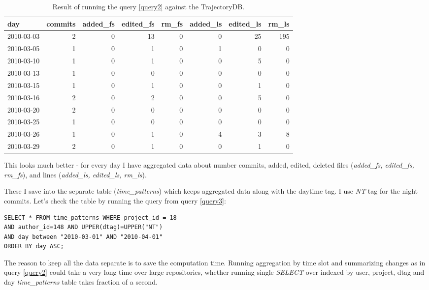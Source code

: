 \documentclass[a4paper,10pt]{article}
\numberwithin{equation}{subsection}
\begin{document}
\begin{table}[h]
  \label{tab:second}
  \caption{Result of running the query \ref{query2} against the TrajectoryDB.}
  \begin{tabularx}{400pt}{ | X | r | r | r | r | r | r | r | }
  \hline           
day & commits & added\_fs & edited\_fs & rm\_fs & added\_ls & edited\_ls & rm\_ls\\ 
\hline           
2010-03-03 & 2 & 0 & 13 & 0 & 0 & 25 & 195\\ 
2010-03-05 & 1 & 0 & 1 & 0 & 1 & 0 & 0\\ 
2010-03-10 & 1 & 0 & 1 & 0 & 0 & 5 & 0\\ 
2010-03-13 & 1 & 0 & 0 & 0 & 0 & 0 & 0\\ 
2010-03-15 & 1 & 0 & 1 & 0 & 0 & 1 & 0\\ 
2010-03-16 & 2 & 0 & 2 & 0 & 0 & 5 & 0\\ 
2010-03-20 & 2 & 0 & 0 & 0 & 0 & 0 & 0\\ 
2010-03-25 & 1 & 0 & 0 & 0 & 0 & 0 & 0\\ 
2010-03-26 & 1 & 0 & 1 & 0 & 4 & 3 & 8\\ 
2010-03-29 & 2 & 0 & 1 & 0 & 0 & 1 & 0\\
\hline    
  \end{tabularx}
\end{table}
This looks much better - for every day I have aggregated data about number commits, added, edited, deleted files (\emph{added\_fs, edited\_fs, rm\_fs}),
and lines (\emph{added\_ls, edited\_ls, rm\_ls}).
\clearpage

These I save into the separate table (\emph{time\_patterns}) which keeps aggregated data along with the daytime tag. 
I use \emph{NT} tag for the night commits. Let's check the table by running the query from query \ref{query3}:

\begin{lstlisting}[label=query3,caption=Data summary from time\_patterns table]
SELECT * FROM time_patterns WHERE project_id = 18
AND author_id=148 AND UPPER(dtag)=UPPER("NT")
AND day between "2010-03-01" AND "2010-04-01"
ORDER BY day ASC;
\end{lstlisting}

The reason to keep all the data separate is to save the computation time. Running aggregation by time slot and summarizing changes 
as in query \ref{query2} could take a very long time over large repositories, whether running single \emph{SELECT} over 
indexed by user, project, dtag and day \emph{time\_patterns} table takes fraction of a second.
\end{document}
